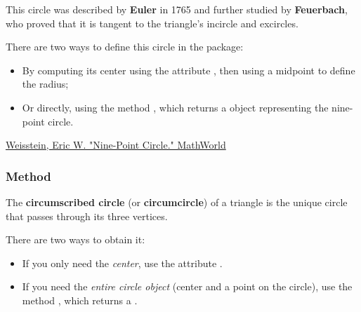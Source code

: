 \noindent
This circle was described by \textbf{Euler} in 1765 and further studied by \textbf{Feuerbach}, who proved that it is tangent to the triangle’s incircle and excircles.

\medskip
\noindent
There are two ways to define this circle in the package:
\begin{itemize}
  \item By computing its center using the attribute , then using a midpoint to define the radius;
  \item Or directly, using the method , which returns a  object representing the nine-point circle.
\end{itemize}

\begin{flushright}
\small
\href{https://mathworld.wolfram.com/Nine-PointCircle.html}{Weisstein, Eric W. "Nine-Point Circle." MathWorld}
\end{flushright}

\vspace{1em}

\vspace{1em}
\begin{tkzexample}[latex=.5\textwidth]
\begin{center}
\end{center}
\end{tkzexample}


\subsubsection{Method } %
\label{ssub:method_triangle_circum_circle}

The \textbf{circumscribed circle} (or \textbf{circumcircle}) of a triangle is the unique circle that passes through its three vertices.

\medskip
\noindent
There are two ways to obtain it:
\begin{itemize}
  \item If you only need the \emph{center}, use the attribute .
  \item If you need the \emph{entire circle object} (center and a point on the circle), use the method , which returns a .
\end{itemize}

